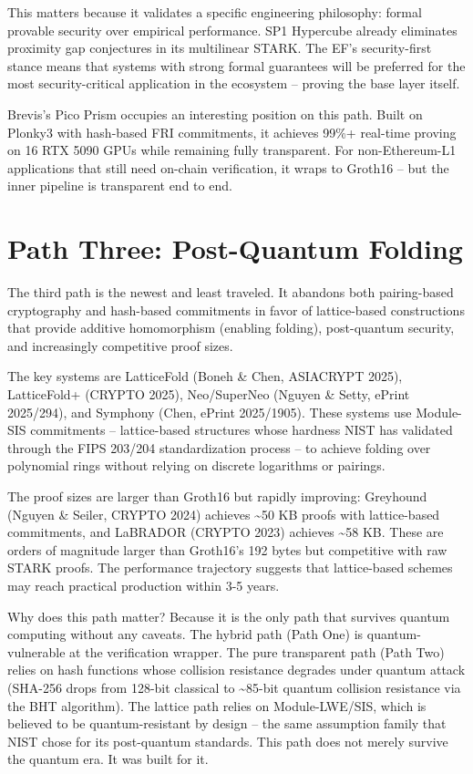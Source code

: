 \documentclass[
  11pt,
  openany]{report}
\begin{document}
This matters because it validates a specific engineering philosophy: formal
provable security over empirical performance. SP1 Hypercube already eliminates
proximity gap conjectures in its multilinear STARK. The EF's security-first
stance means that systems with strong formal guarantees will be preferred for
the most security-critical application in the ecosystem -- proving the base
layer itself.

Brevis's Pico Prism occupies an interesting position on this path. Built on
Plonky3 with hash-based FRI commitments, it achieves 99\%+ real-time proving on
16 RTX 5090 GPUs while remaining fully transparent. For non-Ethereum-L1
applications that still need on-chain verification, it wraps to Groth16 -- but
the inner pipeline is transparent end to end.

\section{Path Three: Post-Quantum
Folding}\label{path-three-post-quantum-folding}

The third path is the newest and least traveled. It abandons both pairing-based
cryptography and hash-based commitments in favor of lattice-based constructions
that provide additive homomorphism (enabling folding), post-quantum security,
and increasingly competitive proof sizes.

The key systems are LatticeFold (Boneh \& Chen, ASIACRYPT 2025), LatticeFold+
(CRYPTO 2025), Neo/SuperNeo (Nguyen \& Setty, ePrint 2025/294), and Symphony
(Chen, ePrint 2025/1905). These systems use Module-SIS commitments --
lattice-based structures whose hardness NIST has validated through the FIPS
203/204 standardization process -- to achieve folding over polynomial rings
without relying on discrete logarithms or pairings.

The proof sizes are larger than Groth16 but rapidly improving: Greyhound (Nguyen
\& Seiler, CRYPTO 2024) achieves \textasciitilde50 KB proofs with lattice-based
commitments, and LaBRADOR (CRYPTO 2023) achieves \textasciitilde58 KB. These are
orders of magnitude larger than Groth16's 192 bytes but competitive with raw
STARK proofs. The performance trajectory suggests that lattice-based schemes may
reach practical production within 3-5 years.

Why does this path matter? Because it is the only path that survives quantum
computing without any caveats. The hybrid path (Path One) is quantum-vulnerable
at the verification wrapper. The pure transparent path (Path Two) relies on hash
functions whose collision resistance degrades under quantum attack (SHA-256
drops from 128-bit classical to \textasciitilde85-bit quantum collision
resistance via the BHT algorithm). The lattice path relies on Module-LWE/SIS,
which is believed to be quantum-resistant by design -- the same assumption
family that NIST chose for its post-quantum standards. This path does not merely
survive the quantum era. It was built for it.
\end{document}

